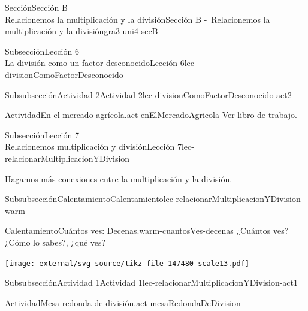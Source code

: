 \begin{sectionptx}{Sección}{{\Large Sección B\\}Relacionemos la multiplicación y la división}{}{Sección B -~Relacionemos la multiplicación y la división}{}{}{gra3-uni4-secB}
\begin{subsectionptx}{Subsección}{{\normalsize Lección 6\\[-0.05cm]}La división como un factor desconocido}{}{Lección 6}{}{}{lec-divisionComoFactorDesconocido}
\begin{subsubsectionptx}{Subsubsección}{Actividad 2}{}{Actividad 2}{}{}{lec-divisionComoFactorDesconocido-act2}
\begin{activity}{Actividad}{En el mercado agrícola.}{act-enElMercadoAgricola}%
Ver libro de trabajo.
\end{activity}%
\end{subsubsectionptx}
\end{subsectionptx}
%
%
\typeout{************************************************}
\typeout{************************************************}
%
\begin{subsectionptx}{Subsección}{{\normalsize Lección 7\\[-0.05cm]}Relacionemos multiplicación y división}{}{Lección 7}{}{}{lec-relacionarMultiplicacionYDivision}
\begin{introduction}{}%
Hagamos más conexiones entre la multiplicación y la división.%
\end{introduction}%
%
%
\typeout{************************************************}
\typeout{************************************************}
%
\begin{subsubsectionptx}{Subsubsección}{Calentamiento}{}{Calentamiento}{}{}{lec-relacionarMultiplicacionYDivision-warm}
\begin{exploration}{Calentamiento}{Cuántos ves: Decenas.}{warm-cuantosVes-decenas}%
¿Cuántos ves?\\
 ¿Cómo lo sabes?, ¿qué ves?%
\begin{image}{0}{1}{0}{}%
\texttt{[image: external/svg-source/tikz-file-147480-scale13.pdf]}
\end{image}%
\end{exploration}%
\end{subsubsectionptx}
%
%
\typeout{************************************************}
\typeout{************************************************}
%
\begin{subsubsectionptx}{Subsubsección}{Actividad 1}{}{Actividad 1}{}{}{lec-relacionarMultiplicacionYDivision-act1}
\begin{activity}{Actividad}{Mesa redonda de división.}{act-mesaRedondaDeDivision}%

\end{activity}
\end{subsubsectionptx}
\end{subsectionptx}
\end{sectionptx}
